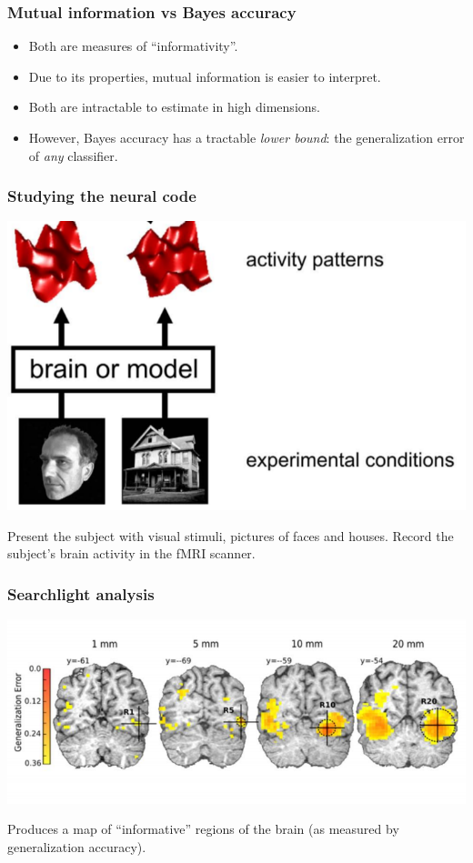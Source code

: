 \documentclass{beamer}
\begin{document}
\begin{frame}
\frametitle{Mutual information vs Bayes accuracy}
\begin{itemize}
\item Both are measures of ``informativity''.
\item Due to its properties, mutual information is easier to interpret.
\item Both are intractable to estimate in high dimensions.
\item However, Bayes accuracy has a tractable \emph{lower bound}: the generalization error of \emph{any} classifier.
\end{itemize}
\end{frame}

\begin{frame}
\frametitle{Studying the neural code}
\begin{center}
\includegraphics[scale = 0.3]{k08_step1.png}
\end{center}
Present the subject with visual stimuli, pictures of faces and houses.
Record the subject's brain activity in the fMRI scanner.
\end{frame}

%
{

}

\begin{frame}
\frametitle{Searchlight analysis}
\begin{center}
\includegraphics[scale = 0.5]{searchlight_windowsize.png}
\end{center}
Produces a map of ``informative'' regions of the brain (as measured by generalization accuracy).
\end{frame}
\end{document}
